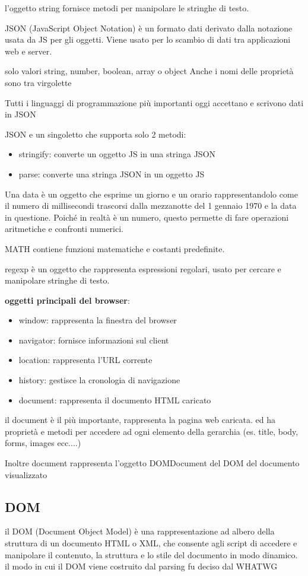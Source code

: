 \documentclass[12pt]{article}
\begin{document}
l'oggetto string fornisce metodi per manipolare le stringhe di testo.

JSON (JavaScript Object Notation) è un formato dati derivato dalla notazione
usata da JS per gli oggetti. Viene usato per lo scambio di dati tra
applicazioni web e server.

solo valori string, number, boolean, array o object
Anche i nomi delle proprietà sono tra virgolette

Tutti i linguaggi di programmazione più importanti
oggi accettano e scrivono dati in JSON

JSON e un singoletto che supporta solo 2 metodi:
\begin{itemize}
    \item stringify: converte un oggetto JS in una stringa JSON
    \item parse: converte una stringa JSON in un oggetto JS
    \end{itemize}

    Una data è un oggetto che esprime un giorno e un orario rappresentandolo come il numero
di millisecondi trascorsi dalla mezzanotte del 1 gennaio 1970 e la data in questione. Poiché
in realtà è un numero, questo permette di fare operazioni aritmetiche e confronti numerici.

MATH contiene funzioni matematiche e costanti predefinite.

regexp è un oggetto che rappresenta espressioni regolari, usato per cercare e manipolare stringhe di testo.

\textbf{oggetti principali del browser}:
\begin{itemize}
    \item window: rappresenta la finestra del browser
    \item navigator: fornisce informazioni sul client
    \item location: rappresenta l'URL corrente
    \item history: gestisce la cronologia di navigazione
    \item document: rappresenta il documento HTML caricato
    \end{itemize}

    il document è il più importante, rappresenta la pagina web caricata. ed ha proprietà e metodi per accedere ad ogni elemento della gerarchia (es. title, body, forms, images ecc....)

Inoltre document rappresenta l'oggetto DOMDocument del
DOM del documento visualizzato

\subsection{DOM}
il DOM (Document Object Model) è una rappresentazione ad albero della struttura di un documento HTML o XML, che consente agli script di accedere e manipolare il contenuto, la struttura e lo stile del documento in modo dinamico.
il modo in cui il DOM viene costruito dal parsing fu deciso dal WHATWG
\end{document}

